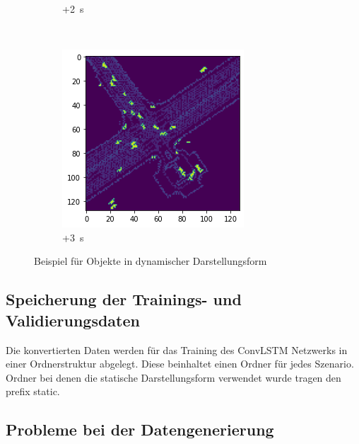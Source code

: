 \documentclass[12pt]{article}
\begin{document}
\begin{figure}[H]
\begin{subfigure}[b]{0.18\textwidth}
                \caption{+2~s}
            \end{subfigure}
            ~
            \begin{subfigure}[b]{0.18\textwidth}
                \includegraphics[width=\textwidth]{example_dynamic_objects_40.png}
                \caption{+3~s}
            \end{subfigure}
            \caption{Beispiel für Objekte in dynamischer Darstellungsform}\label{fig:dyn_objects}
        \end{figure}

    \subsection{Speicherung der Trainings- und Validierungsdaten}
        Die konvertierten Daten werden für das Training des ConvLSTM Netzwerks in einer Ordnerstruktur abgelegt. 
        Diese beinhaltet einen Ordner für jedes Szenario. 
        Ordner bei denen die statische Darstellungsform verwendet wurde tragen den prefix \grqq static\textunderscore\grqq .
    \subsection{Probleme bei der Datengenerierung} 
\end{document}
